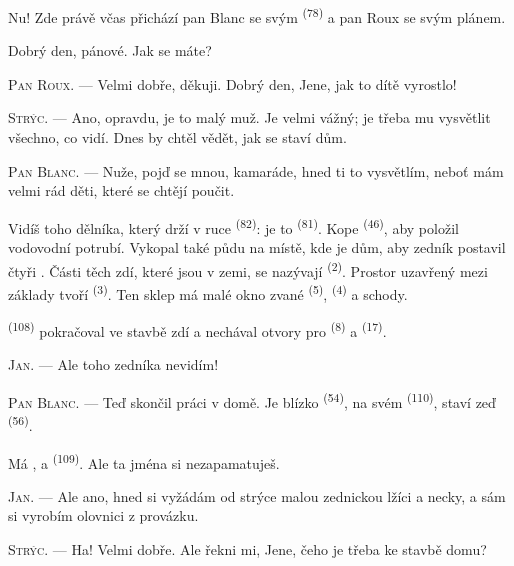 Nu! Zde právě včas přichází pan Blanc se svým 
\textsuperscript{(78)} a pan Roux se svým plánem.

Dobrý den, pánové. Jak se máte?

\textsc{Pan Roux}. --- Velmi dobře, děkuji. Dobrý den, Jene, jak to dítě vyrostlo!

\textsc{Strýc}. --- Ano, opravdu, je to malý muž. Je velmi vážný; je třeba mu vysvětlit
všechno, co vidí. Dnes by chtěl vědět, jak se staví dům.

\VUsaut{3.0mm}

\textsc{Pan Blanc}. --- Nuže, pojď se mnou, kamaráde, hned ti to vysvětlím, neboť mám
velmi rád děti, které se chtějí poučit.

Vidíš toho dělníka, který drží v ruce  \textsuperscript{(82)}: je to
 \textsuperscript{(81)}. Kope 
\textsuperscript{(46)}, aby položil vodovodní potrubí. Vykopal také půdu na místě, kde
je dům, aby zedník postavil čtyři . Části těch zdí, které jsou v zemi, se
nazývají  \textsuperscript{(2)}. Prostor uzavřený mezi základy tvoří
 \textsuperscript{(3)}. Ten sklep má malé okno zvané  \textsuperscript{(5)},  \textsuperscript{(4)} a schody.

 \textsuperscript{(108)} pokračoval ve stavbě zdí a nechával otvory pro
 \textsuperscript{(8)} a  \textsuperscript{(17)}.

\textsc{Jan}. --- Ale toho zedníka nevidím!

\textsc{Pan Blanc}. --- Teď skončil práci v domě. Je blízko 
\textsuperscript{(54)}, na svém  \textsuperscript{(110)}, staví zeď
 \textsuperscript{(56)}.

Má ,  a 
\textsuperscript{(109)}. Ale ta jména si nezapamatuješ.

\textsc{Jan}. --- Ale ano, hned si vyžádám od strýce malou zednickou lžíci a necky, a
sám si vyrobím olovnici z provázku.

\VUsaut{3.0mm}
\VUsaut{3.0mm}

\textsc{Strýc}. --- Ha! Velmi dobře. Ale řekni mi, Jene, čeho je třeba ke stavbě domu?

